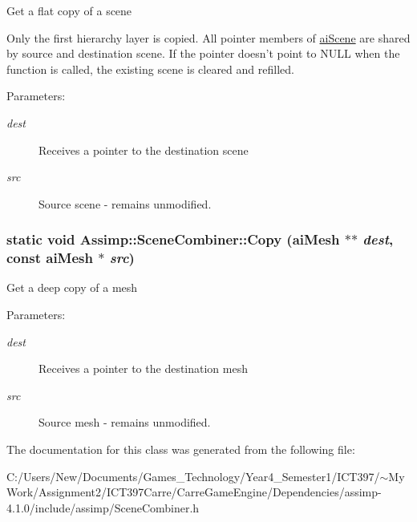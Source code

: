 Get a flat copy of a scene

Only the first hierarchy layer is copied. All pointer members of \hyperlink{structai_scene}{aiScene} are shared by source and destination scene. If the pointer doesn't point to NULL when the function is called, the existing scene is cleared and refilled. \begin{Desc}
\item[Parameters:]
\begin{description}
\item[{\em dest}]Receives a pointer to the destination scene \item[{\em src}]Source scene - remains unmodified. \end{description}
\end{Desc}
\hypertarget{class_assimp_1_1_scene_combiner_abed196fdfb16f82873ec811c6a64bfc}{
\subsubsection[Copy]{\setlength{\rightskip}{0pt plus 5cm}static void Assimp::SceneCombiner::Copy ({\bf aiMesh} $\ast$$\ast$ {\em dest}, \/  const {\bf aiMesh} $\ast$ {\em src})}}
\label{class_assimp_1_1_scene_combiner_abed196fdfb16f82873ec811c6a64bfc}


Get a deep copy of a mesh

\begin{Desc}
\item[Parameters:]
\begin{description}
\item[{\em dest}]Receives a pointer to the destination mesh \item[{\em src}]Source mesh - remains unmodified. \end{description}
\end{Desc}


The documentation for this class was generated from the following file:\begin{CompactItemize}
\item 
C:/Users/New/Documents/Games\_\-Technology/Year4\_\-Semester1/ICT397/$\sim$My Work/Assignment2/ICT397Carre/CarreGameEngine/Dependencies/assimp-4.1.0/include/assimp/SceneCombiner.h\end{CompactItemize}
